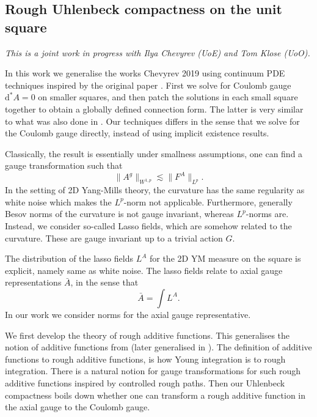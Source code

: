 \documentclass[12pt]{article}
\numberwithin{equation}{section}
\theoremstyle{definition}
\theoremstyle{remark}
\newcommand{\diff}{\mathrm{d}}
\newcommand{\1}{\mathbf 1}
\newcommand{\<}{\langle}
\renewcommand{\>}{\rangle}
\begin{document}

\subsection{Rough Uhlenbeck compactness on the unit square}\label{sec:RUC_square}
\textit{This is a joint work in progress with Ilya Chevyrev (UoE) and Tom Klose (UoO).}

\medskip

\noindent In this work we generalise the works Chevyrev 2019 using continuum PDE techniques inspired by the original paper \cite{Uhlenbeck82}. First we solve for Coulomb gauge $\diff^*A=0$ on smaller squares, and then patch the solutions in each small square together to obtain a globally defined connection form. The latter is very similar to what was also done in \cite{Uhlenbeck82}. Our techniques differs in the sense that we solve for the Coulomb gauge directly, instead of using implicit existence results. 

Classically, the result is essentially under smallness assumptions, one can find a gauge transformation such that 
\[
\|A^g\|_{W^{1,p}}\lesssim \|F^A\|_{L^p}.
\]
In the setting of 2D Yang-Mills theory, the curvature has the same regularity as white noise which makes the $L^p$-norm not applicable. Furthermore, generally Besov norms of the curvature is not gauge invariant, whereas $L^p$-norms are. Instead, we consider so-called Lasso fields, which are somehow related to the curvature. These are gauge invariant up to a trivial action $G$. 

The distribution of the lasso fields $L^A$ for the 2D YM measure on the square is explicit, namely same as white noise. The lasso fields relate to axial gauge representations $\bar A$, in the sense that 
\[
\bar A=\int L^A. 
\]
In our work we consider norms for the axial gauge representative. 

We first develop the theory of rough additive functions. This generalises the notion of additive functions from \cite{Chevyrev19} (later generalised in \cite{CCHS2d}). The definition of additive functions to rough additive functions, is how Young integration is to rough integration. There is a natural notion for gauge transformations for such rough additive functions inspired by controlled rough paths. Then our Uhlenbeck compactness boils down whether one can transform a rough additive function in the axial gauge to the Coulomb gauge. 
\end{document}
